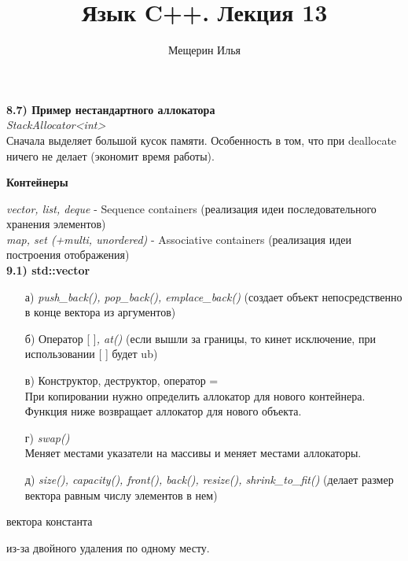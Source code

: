 \documentclass{article}
\title{Язык C++. Лекция 13}
\author{Мещерин Илья}
\date{\DTMdate{2018-12-10}}
\begin{document}
\maketitle

\noindent \textbf{8.7) Пример нестандартного аллокатора} \\
\textit{StackAllocator<int>} \\
Сначала выделяет большой кусок памяти. Особенность в том, что при deallocate ничего не делает (экономит время работы). 

\begin{center}
	\begin{large}
		\textbf{Контейнеры}
	\end{large}
\end{center}


\noindent \textit{vector, list, deque} - Sequence containers (реализация идеи последовательного хранения элементов)\\
\textit{map, set (+multi, unordered)} - Associative containers (реализация идеи построения отображения)\\
\textbf{9.1) std::vector}
\begin{itemize}

	\item[а)] 
\textit{push\_back(), pop\_back(), emplace\_back()} (создает объект непосредственно в конце вектора из аргументов)\\
	
	\item[б)] Оператор {[ ]}\textit{, at()} (если вышли за границы, то кинет исключение, при использовании [ ] будет ub)

	\item[в)] Конструктор, деструктор, оператор =\\
При копировании нужно определить аллокатор для нового контейнера. Функция ниже возвращает аллокатор для нового объекта.

	\item[г)] \textit{swap()}\\
Меняет местами указатели на массивы и меняет местами аллокаторы.
	\item[д)] \textit{size(), capacity(), front(), back(), resize(), shrink\_to\_fit()} (делает размер вектора равным числу элементов в нем)
\end{itemize}

 вектора константа


 из-за двойного удаления по одному месту.

\end{document}
